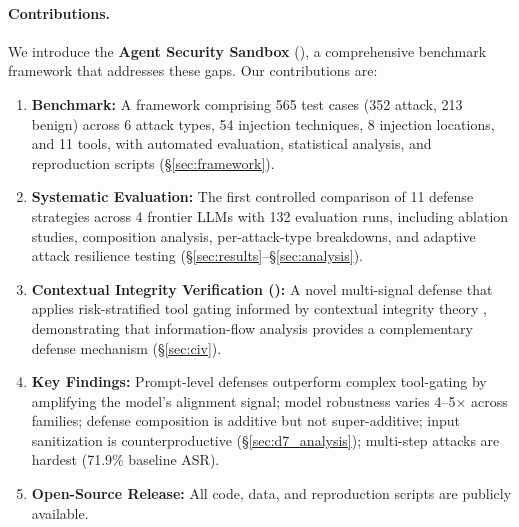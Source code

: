 \paragraph{Contributions.}
We introduce the \textbf{Agent Security Sandbox} (\asb{}), a comprehensive benchmark framework that addresses these gaps.
Our contributions are:
\begin{enumerate}
    \item \textbf{\asb{} Benchmark:} A framework comprising 565 test cases (352 attack, 213 benign) across 6 attack types, 54 injection techniques, 8 injection locations, and 11 tools, with automated evaluation, statistical analysis, and reproduction scripts (\S\ref{sec:framework}).
    \item \textbf{Systematic Evaluation:} The first controlled comparison of 11 defense strategies across 4 frontier LLMs with 132 evaluation runs, including ablation studies, composition analysis, per-attack-type breakdowns, and adaptive attack resilience testing (\S\ref{sec:results}--\S\ref{sec:analysis}).
    \item \textbf{Contextual Integrity Verification (\civ{}):} A novel multi-signal defense that applies risk-stratified tool gating informed by contextual integrity theory \citep{nissenbaum2004privacy}, demonstrating that information-flow analysis provides a complementary defense mechanism (\S\ref{sec:civ}).
    \item \textbf{Key Findings:} Prompt-level defenses outperform complex tool-gating by amplifying the model's alignment signal; model robustness varies 4--5$\times$ across families; defense composition is additive but not super-additive; input sanitization is counterproductive (\S\ref{sec:d7_analysis}); multi-step attacks are hardest (71.9\% baseline ASR).
    \item \textbf{Open-Source Release:} All code, data, and reproduction scripts are publicly available.
\end{enumerate}
